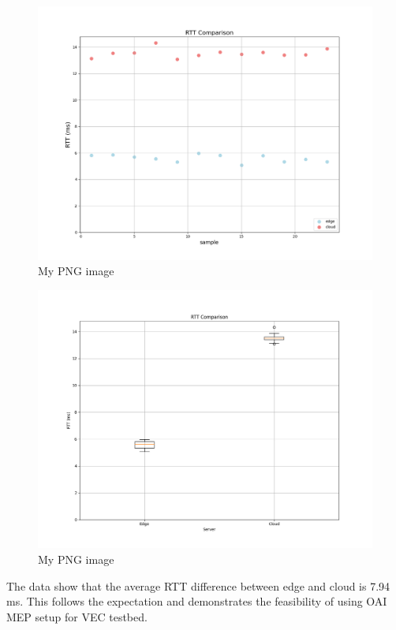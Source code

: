 \documentclass[12pt,a4paper,twoside]{report}
\begin{document}
\begin{figure}[ht]
	\centering
	\includegraphics[width=13cm]{./images/RTT-comparison.png} 
	\caption{My PNG image}
\end{figure}
\begin{figure}[ht]
	\centering
	\includegraphics[width=13cm]{./images/RTT_comp_box.png} 
	\caption{My PNG image}
\end{figure}

The data show that the average RTT difference between edge and cloud is 7.94 ms. This follows the expectation and demonstrates the feasibility of using OAI MEP setup for VEC testbed.
\end{document}
